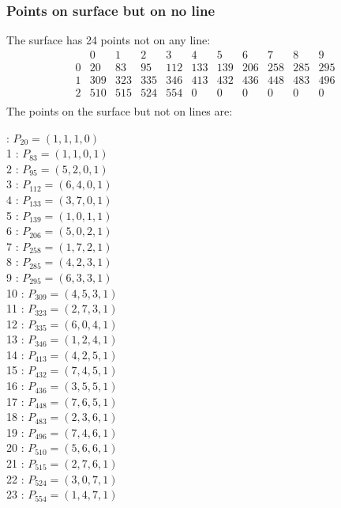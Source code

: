 \documentclass{article}
\begin{document}
{\subsubsection*{Points on surface but on no line}
The surface has 24 points not on any line:\\
$$
\begin{array}{r|*{10}{r}}
 & 0 & 1 & 2 & 3 & 4 & 5 & 6 & 7 & 8 & 9\\
\hline
0 & 20 & 83 & 95 & 112 & 133 & 139 & 206 & 258 & 285 & 295\\
1 & 309 & 323 & 335 & 346 & 413 & 432 & 436 & 448 & 483 & 496\\
2 & 510 & 515 & 524 & 554 & 0 & 0 & 0 & 0 & 0 & 0\\
\end{array}
$$
The points on the surface but not on lines are:\\
\begin{multicols}{2}
 : $P_{20}=( 1, 1, 1, 0 )$\\
1 : $P_{83}=( 1, 1, 0, 1 )$\\
2 : $P_{95}=( 5, 2, 0, 1 )$\\
3 : $P_{112}=( 6, 4, 0, 1 )$\\
4 : $P_{133}=( 3, 7, 0, 1 )$\\
5 : $P_{139}=( 1, 0, 1, 1 )$\\
6 : $P_{206}=( 5, 0, 2, 1 )$\\
7 : $P_{258}=( 1, 7, 2, 1 )$\\
8 : $P_{285}=( 4, 2, 3, 1 )$\\
9 : $P_{295}=( 6, 3, 3, 1 )$\\
10 : $P_{309}=( 4, 5, 3, 1 )$\\
11 : $P_{323}=( 2, 7, 3, 1 )$\\
12 : $P_{335}=( 6, 0, 4, 1 )$\\
13 : $P_{346}=( 1, 2, 4, 1 )$\\
14 : $P_{413}=( 4, 2, 5, 1 )$\\
15 : $P_{432}=( 7, 4, 5, 1 )$\\
16 : $P_{436}=( 3, 5, 5, 1 )$\\
17 : $P_{448}=( 7, 6, 5, 1 )$\\
18 : $P_{483}=( 2, 3, 6, 1 )$\\
19 : $P_{496}=( 7, 4, 6, 1 )$\\
20 : $P_{510}=( 5, 6, 6, 1 )$\\
21 : $P_{515}=( 2, 7, 6, 1 )$\\
22 : $P_{524}=( 3, 0, 7, 1 )$\\
23 : $P_{554}=( 1, 4, 7, 1 )$\\
\end{multicols}
}
\end{document}
